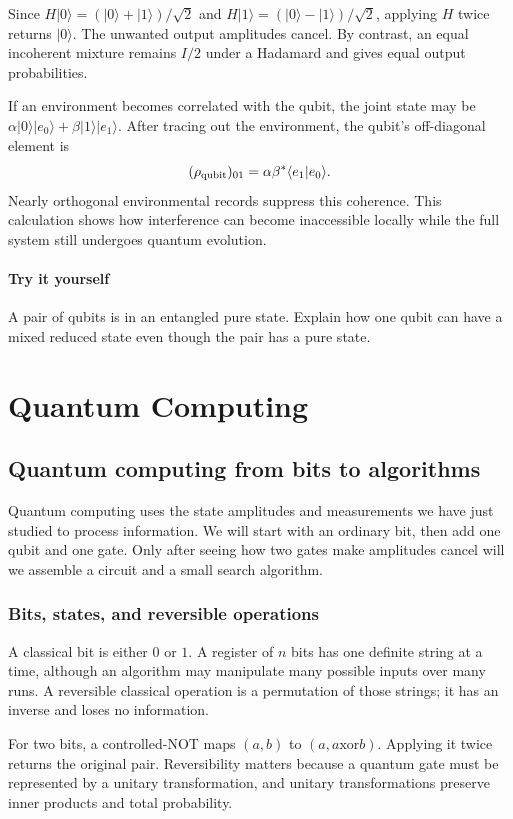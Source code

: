 \documentclass[11pt,oneside]{book}
\newcommand{\ket}[1]{\lvert #1\rangle}
\theoremstyle{reviewstyle}
\newcommand{\learningcheck}[1]{\subsection*{Try it yourself}\noindent #1\par}
\begin{document}
Since $H\ket0=(\ket0+\ket1)/\sqrt2$ and $H\ket1=(\ket0-\ket1)/\sqrt2$, applying $H$ twice returns $\ket0$. The unwanted output amplitudes cancel. By contrast, an equal incoherent mixture remains $I/2$ under a Hadamard and gives equal output probabilities.

If an environment becomes correlated with the qubit, the joint state may be $\alpha\ket0\ket{e_0}+\beta\ket1\ket{e_1}$. After tracing out the environment, the qubit's off-diagonal element is
\begin{equation}
(\rho_{\rm qubit})_{01}=\alpha\beta^*\langle e_1|e_0\rangle.
\end{equation}
Nearly orthogonal environmental records suppress this coherence. This calculation shows how interference can become inaccessible locally while the full system still undergoes quantum evolution.

\learningcheck{A pair of qubits is in an entangled pure state. Explain how one qubit can have a mixed reduced state even though the pair has a pure state.}

\part{Quantum Computing}
\chapter{Quantum computing from bits to algorithms}
Quantum computing uses the state amplitudes and measurements we have just studied to process information. We will start with an ordinary bit, then add one qubit and one gate. Only after seeing how two gates make amplitudes cancel will we assemble a circuit and a small search algorithm.

\section{Bits, states, and reversible operations}
A classical bit is either $0$ or $1$. A register of $n$ bits has one definite string at a time, although an algorithm may manipulate many possible inputs over many runs. A reversible classical operation is a permutation of those strings; it has an inverse and loses no information.

For two bits, a controlled-NOT maps $(a,b)$ to $(a,a\mathbin{\mathrm{xor}}b)$. Applying it twice returns the original pair. Reversibility matters because a quantum gate must be represented by a unitary transformation, and unitary transformations preserve inner products and total probability.
\end{document}
